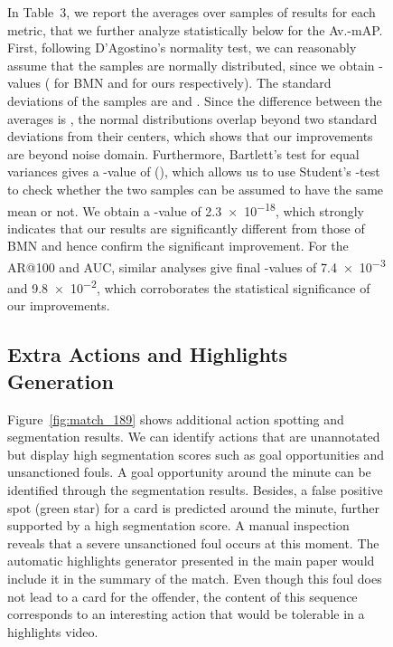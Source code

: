 \documentclass[10pt,twocolumn,letterpaper]{article}
\begin{document}
\begin{figure}[t]
{\begin{minipage}{\linewidth}
In Table~3, we report the averages over samples of  results for each metric, that we further analyze statistically below for the Av.-mAP.
First, following D'Agostino's normality test, we can reasonably assume that the samples are normally distributed, since we obtain -values  ( for BMN and  for ours respectively). The standard deviations of the samples are  and . Since the difference between the averages is , the normal distributions overlap beyond two standard deviations from their centers, which shows that our improvements are beyond noise domain. Furthermore, Bartlett's test for equal variances gives a -value of  (), which allows us to use Student's -test to check whether the two samples can be assumed to have the same mean or not. We obtain a -value of \num{2.3e-18}, which strongly indicates that our results are significantly different from those of BMN and hence confirm the significant improvement.
For the AR@100 and AUC, similar analyses give final -values of \num{7.4e-3} and \num{9.8e-2}, which corroborates the statistical significance of our improvements.


\subsection{Extra Actions and Highlights Generation}


Figure~\ref{fig:match_189} shows additional action spotting and segmentation results. We can identify actions that are unannotated but display high segmentation scores such as goal opportunities and unsanctioned fouls. A goal opportunity around the  minute can be identified through the segmentation results. Besides, a false positive spot (green star) for a card is predicted around the  minute, further supported by a high segmentation score. A manual inspection reveals that a severe unsanctioned foul occurs at this moment. The automatic highlights generator presented in the main paper would include it in the summary of the match. Even though this foul does not lead to a card for the offender, the content of this sequence corresponds to an interesting action that would be tolerable in a highlights video.






\end{minipage}}
\end{figure}
\end{document}
